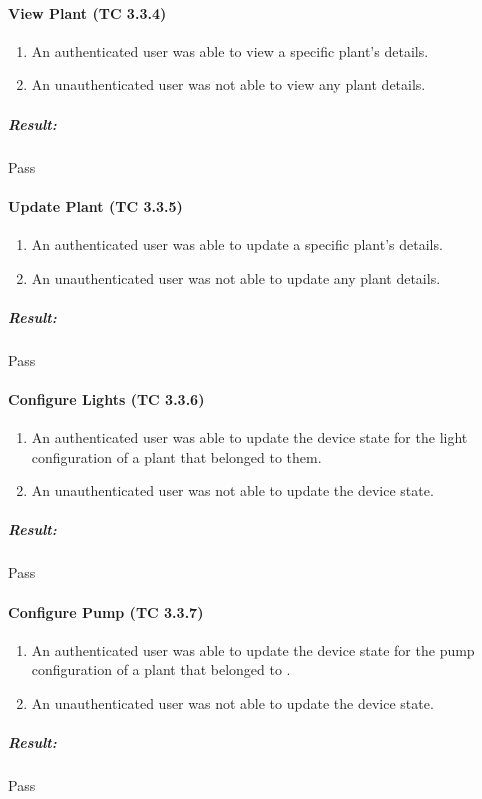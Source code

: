 \documentclass{article}
\begin{document}
			\paragraph{View Plant (TC 3.3.4)}
				\begin{enumerate}
					\item An authenticated user was able to view a specific plant's details.
					\item An unauthenticated user was not able to view any plant details. 
				\end{enumerate}
				\subparagraph{Result: } Pass
				
			\paragraph{Update Plant (TC 3.3.5)}
				\begin{enumerate}
					\item An authenticated user was able to update a specific plant's details.
					\item An unauthenticated user was not able to update any plant details.
				\end{enumerate}
				\subparagraph{Result: } Pass
				
			\paragraph{Configure Lights (TC 3.3.6)}
				\begin{enumerate}
					\item An authenticated user was able to update the device state for the light configuration of a plant that belonged to them.
					\item An unauthenticated user was not able to update the device state.
				\end{enumerate}
				\subparagraph{Result: } Pass
				
			\paragraph{Configure Pump (TC 3.3.7)}
				\begin{enumerate}
					\item An authenticated user was able to update the device state for the pump configuration of a plant that belonged to .
					\item An unauthenticated user was not able to update the device state.
				\end{enumerate}
				\subparagraph{Result: } Pass
				
\end{document}
